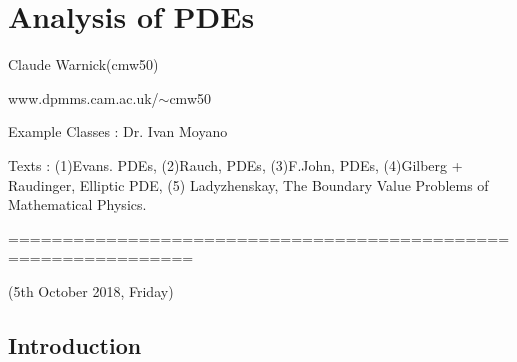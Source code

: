 \documentclass[12pt,a4paper]{report}
\DeclarePairedDelimiter\bignorm{\lVert}{\rVert}
\begin{document}
\newcommand{\thm}{\textbf{Theorem) }}
\newcommand{\thmnum}[1]{\textbf{Theorem #1) }}
\newcommand{\defi}{\textbf{Definition) }}
\newcommand{\definum}[1]{\textbf{Definition #1) }}
\newcommand{\lem}{\textbf{Lemma) }}
\newcommand{\lemnum}[1]{\textbf{Lemma #1) }}
\newcommand{\prop}{\textbf{Proposition) }}
\newcommand{\propnum}[1]{\textbf{Proposition #1) }}
\newcommand{\corr}{\textbf{Corollary) }}
\newcommand{\corrnum}[1]{\textbf{Corollary #1) }}
\newcommand{\pf}{\textbf{proof) }}

\newcommand{\lap}{\triangle} %
\newcommand{\s}{\vspace{10pt}}
\newcommand{\bull}{$\bullet$}
\newcommand{\sta}{$\star$}
\newcommand{\reals}{\mathbb{R}}

\newcommand{\eop}{\hfill  \textsl{(End of proof)} $\square$} %
\newcommand{\eos}{\hfill  \textsl{(End of statement)} $\square$} %


\newcommand{\intN}{\mathbb{Z}_N}
\newcommand{\nat}{\mathbb{N}}
\newcommand{\norms}[2]{\bignorm[\big]{#1}_{#2}}
\newcommand{\abs}[1]{\big| #1 \big|}
\newcommand{\avg}{\mathbb{E}}
\newcommand{\prob}{\mathbb{P}}
\newcommand{\borel}{\mathscr{B}}
\newcommand{\EE}{\mathscr{E}}
\newcommand{\pa}{\partial}

\renewcommand{\bar}{\overline}

\def\doubleunderline#1{\underline{\underline{#1}}}

\newcommand{\newday}{===============================================================}
\newcommand{\digression}{**********************************************************************************************}


\setlength\parindent{0pt}

\chapter*{Analysis of PDEs}
\s

Claude Warnick(cmw50)

www.dpmms.cam.ac.uk/$\sim$cmw50

Example Classes : Dr. Ivan Moyano
\s

Texts : (1)Evans. PDEs, (2)Rauch, PDEs, (3)F.John, PDEs, (4)Gilberg + Raudinger, Elliptic PDE, (5) Ladyzhenskay, The Boundary Value Problems of Mathematical Physics.
\s

\newday

(5th October 2018, Friday)
\s

\section*{Introduction}
\end{document}
